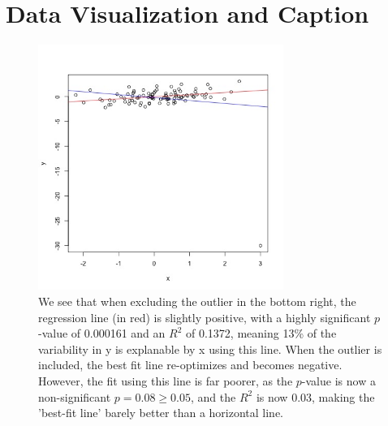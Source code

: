\documentclass[11pt, oneside]{article}
\begin{document}
\section*{Data Visualization and Caption}
\begin{figure}[h]
	\includegraphics[width = 8cm, height = 8cm]{q1.jpg}
	\caption{We see that when excluding the outlier in the bottom right, the regression line (in red) is slightly positive, with a highly significant $p$-value of 0.000161 and an $R^2$ of 0.1372, meaning 13\% of the variability in y is explanable by x using this line. When the outlier is included, the best fit line re-optimizes and becomes negative. However, the fit using this line is far poorer, as the $p$-value is now a non-significant $p = 0.08 \geq 0.05$, and the $R^2$ is now 0.03, making the 'best-fit line' barely better than a horizontal line. \protect\footnotemark}
\end{figure}

\newpage
\end{document}
